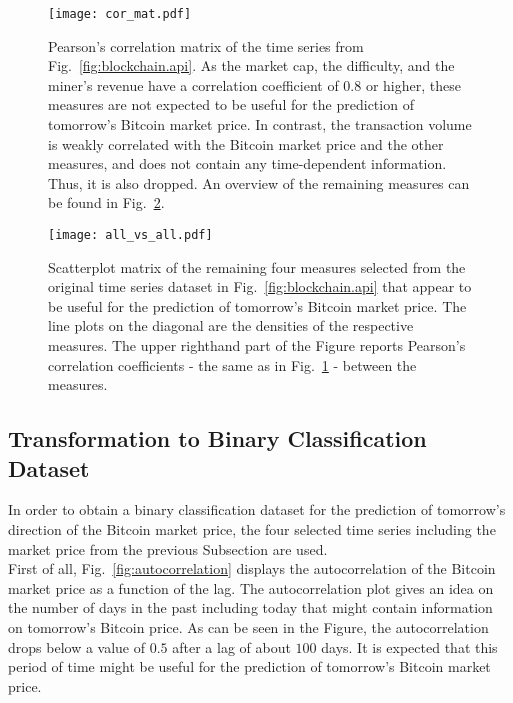 \begin{figure}[h!]
  \centering
  \texttt{[image: cor\_mat.pdf]}
  \caption{Pearson's correlation matrix of the time series from Fig.~\ref{fig:blockchain.api}. As the market cap, the difficulty, and the miner's revenue have a correlation coefficient of $0.8$ or higher, these measures are not expected to be useful for the prediction of tomorrow's Bitcoin market price. In contrast, the transaction volume is weakly correlated with the Bitcoin market price and the other measures, and does not contain any time-dependent information. Thus, it is also dropped. An overview of the remaining measures can be found in Fig.~\ref{fig:all_vs_all}.}
  \label{fig:correlation_matrix}
\end{figure}

\begin{figure}[h!]
	\centering
	\texttt{[image: all\_vs\_all.pdf]}
    \caption{Scatterplot matrix of the remaining four measures selected from the original time series dataset in Fig.~\ref{fig:blockchain.api} that appear to be useful for the prediction of tomorrow's Bitcoin market price. The line plots on the diagonal are the densities of the respective measures. The upper righthand part of the Figure reports Pearson's correlation coefficients - the same as in Fig.~\ref{fig:correlation_matrix} - between the measures.}
    \label{fig:all_vs_all}
\end{figure}

\subsection{Transformation to Binary Classification Dataset}\label{subsec:bin_class_data}

In order to obtain a binary classification dataset for the prediction of tomorrow's direction of the Bitcoin market price, the four selected time series including the market price from the previous Subsection are used.\\

First of all, Fig.~\ref{fig:autocorrelation} displays the autocorrelation of the Bitcoin market price as a function of the lag. The autocorrelation plot gives an idea on the number of days in the past including today that might contain information on tomorrow's Bitcoin price. As can be seen in the Figure, the autocorrelation drops below a value of $0.5$ after a lag of about $100$ days. It is expected that this period of time might be useful for the prediction of tomorrow's Bitcoin market price.

